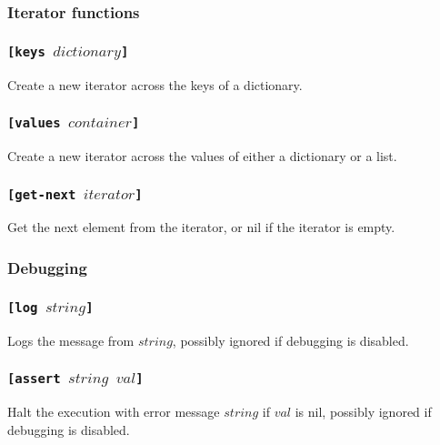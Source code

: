 \documentclass[11pt]{report}
\begin{document}
\subsubsection{Iterator functions}
\subsubsection*{\tt{[keys }$dictionary$\tt{]}}
Create a new iterator across the keys of a dictionary.
\subsubsection*{\tt{[values }$container$\tt{]}}
Create a new iterator across the values of either a dictionary or a list.
\subsubsection*{\tt{[get-next }$iterator$\tt{]}}
Get the next element from the iterator, or nil if the iterator is empty.

\subsubsection{Debugging}
\subsubsection*{\tt{[log }$string$\tt{]}}
Logs the message from $string$, possibly ignored if debugging is disabled.
\subsubsection*{\tt{[assert }$string$ $val$\tt{]}}
Halt the execution with error message $string$ if $val$ is nil, possibly ignored if debugging is disabled.
\end{document}
